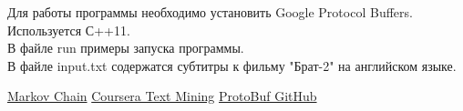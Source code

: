 \documentclass[a4paper]{article}
\begin{document}
Для работы программы необходимо установить Google Protocol Buffers.\\
Используется С++11.\\
В файле run примеры запуска программы.\\
В файле input.txt содержатся субтитры к фильму "Брат-2" на английском языке.

\newpage

\begin{thebibliography}{3}
	 \href{https://en.wikipedia.org/wiki/Markov_chain}{Markov Chain}
	 \href{https://class.coursera.org/nlp/lecture/preview}{Coursera Text Mining}
	 \href{https://github.com/google/protobuf}{ProtoBuf GitHub}
\end{thebibliography}
\end{document}

